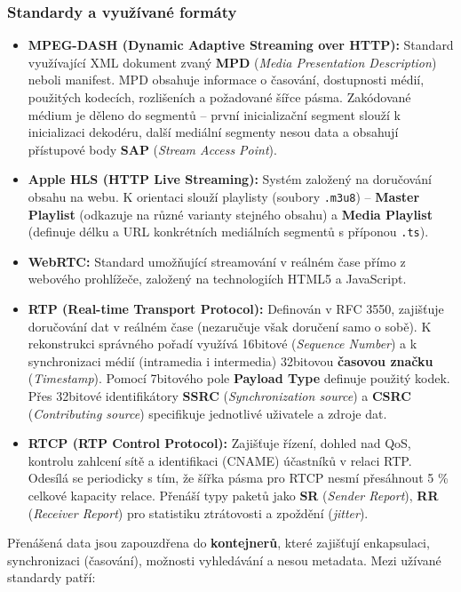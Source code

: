     \subsubsection{Standardy a využívané formáty}
        \begin{itemize}
            \item \textbf{MPEG-DASH (Dynamic Adaptive Streaming over HTTP):} Standard využívající XML dokument zvaný \textbf{MPD} (\textit{Media Presentation Description}) neboli manifest. MPD obsahuje informace o časování, dostupnosti médií, použitých kodecích, rozlišeních a požadované šířce pásma. Zakódované médium je děleno do segmentů -- první inicializační segment slouží k inicializaci dekodéru, další mediální segmenty nesou data a obsahují přístupové body \textbf{SAP} (\textit{Stream Access Point}).
            \item \textbf{Apple HLS (HTTP Live Streaming):} Systém založený na doručování obsahu na webu. K orientaci slouží playlisty (soubory \texttt{.m3u8}) -- \textbf{Master Playlist} (odkazuje na různé varianty stejného obsahu) a \textbf{Media Playlist} (definuje délku a URL konkrétních mediálních segmentů s příponou \texttt{.ts}).
            \item \textbf{WebRTC:} Standard umožňující streamování v reálném čase přímo z webového prohlížeče, založený na technologiích HTML5 a JavaScript.
            \item \textbf{RTP (Real-time Transport Protocol):} Definován v RFC 3550, zajišťuje doručování dat v reálném čase (nezaručuje však doručení samo o sobě). K rekonstrukci správného pořadí využívá 16bitové (\textit{Sequence Number}) a k synchronizaci médií (intramedia i intermedia) 32bitovou \textbf{časovou značku} (\textit{Timestamp}). Pomocí 7bitového pole \textbf{Payload Type} definuje použitý kodek. Přes 32bitové identifikátory \textbf{SSRC} (\textit{Synchronization source}) a \textbf{CSRC} (\textit{Contributing source}) specifikuje jednotlivé uživatele a zdroje dat.
            \item \textbf{RTCP (RTP Control Protocol):} Zajišťuje řízení, dohled nad QoS, kontrolu zahlcení sítě a identifikaci (CNAME) účastníků v relaci RTP. Odesílá se periodicky s tím, že šířka pásma pro RTCP nesmí přesáhnout 5 \% celkové kapacity relace. Přenáší typy paketů jako \textbf{SR} (\textit{Sender Report}), \textbf{RR} (\textit{Receiver Report}) pro statistiku ztrátovosti a zpoždění (\textit{jitter}).
        \end{itemize}
        Přenášená data jsou zapouzdřena do \textbf{kontejnerů}, které zajišťují enkapsulaci, synchronizaci (časování), možnosti vyhledávání a nesou metadata. Mezi užívané standardy patří:
